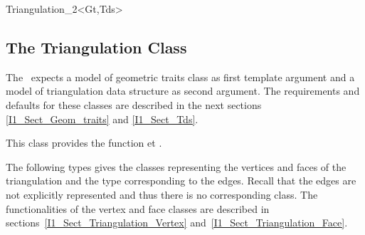 \begin{ccClassTemplate}{Triangulation_2<Gt,Tds>}
\subsection{The Triangulation Class \protect \ccClassTemplateName} 

The \ccClassTemplateName\  expects a model of  {geometric traits} class
as first template argument and a model of {triangulation data structure}
as second argument. The requirements  and defaults for these classes 
are described in the next sections \ref{I1_Sect_Geom_traits}
and \ref{I1_Sect_Tds}.


This class provides the function  et .

\ccTypes
{}
\ccThreeToTwo

\ccGlue
{}

\ccGlue
{}
\ccGlue
{}

The following types gives the classes representing the vertices and faces
 of the triangulation and the type corresponding to the edges.
Recall that the edges are not explicitly represented and thus there is no corresponding class.
The functionalities of the vertex and face classes
 are described in sections~\ref{I1_Sect_Triangulation_Vertex}
and~\ref{I1_Sect_Triangulation_Face}.

\ccGlue
{}
\ccGlue
{}


\end{ccClassTemplate}
